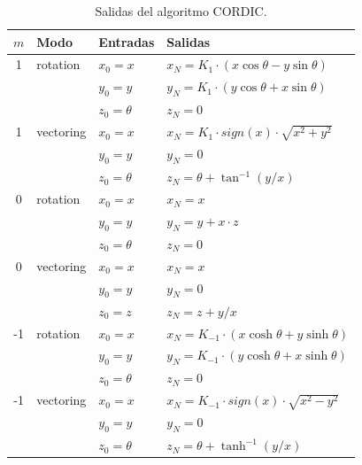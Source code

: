 \documentclass[10pt,a4paper]{book}
\begin{document}
\begin{table}[h!]
\centering
\begin{tabular}{clll}
   \hline
   $m$   &  Modo     &  Entradas          & Salidas                                                \\ \hline \hline
   1     &  rotation &  $x_0 = x$         & $x_N = K_1 \cdot (x \cos\theta - y \sin\theta)$        \\
         &           &  $y_0 = y$         & $y_N = K_1 \cdot (y \cos\theta + x \sin\theta)$        \\
         &           &  $z_0 = \theta$    & $z_N = 0$                                              \\ \hline
   1     &  vectoring&  $x_0 = x$         & $x_N = K_1 \cdot sign(x) \cdot \sqrt{x^2+y^2}$         \\
         &           &  $y_0 = y$         & $y_N = 0$                                              \\
         &           &  $z_0 = \theta$    & $z_N = \theta + \tan^{-1}(y/x)$                        \\ \hline
   0     &  rotation &  $x_0 = x$         & $x_N = x $                                             \\
         &           &  $y_0 = y$         & $y_N = y + x \cdot z$                                  \\
         &           &  $z_0 = \theta$    & $z_N = 0$                                              \\ \hline
   0     &  vectoring&  $x_0 = x$         & $x_N = x$                                              \\
         &           &  $y_0 = y$         & $y_N = 0$                                              \\
         &           &  $z_0 = z$         & $z_N = z + y / x$                                      \\ \hline
   -1    &  rotation &  $x_0 = x$         & $x_N = K_{-1} \cdot (x \cosh\theta + y \sinh\theta)$   \\
         &           &  $y_0 = y$         & $y_N = K_{-1} \cdot (y \cosh\theta + x \sinh\theta)$   \\
         &           &  $z_0 = \theta$    & $z_N = 0$                                              \\ \hline
   -1    &  vectoring&  $x_0 = x$         & $x_N = K_{-1} \cdot sign(x) \cdot \sqrt{x^2-y^2}$      \\
         &           &  $y_0 = y$         & $y_N = 0$                                              \\
         &           &  $z_0 = \theta$    & $z_N = \theta + \tanh^{-1}(y/x)$                       \\ \hline
\end{tabular}
\caption{Salidas del algoritmo CORDIC.}
\label{tab:table_cordic_outputs}
\end{table}
\end{document}
